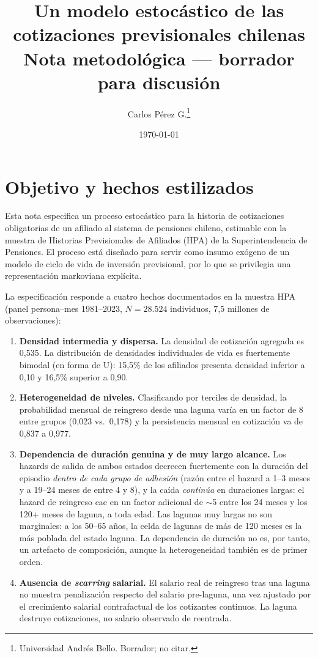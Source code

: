 \documentclass[11pt]{article}
\title{Un modelo estocástico de las cotizaciones previsionales chilenas\\
\large Nota metodológica — borrador para discusión}
\author{Carlos Pérez G.\thanks{Universidad Andrés Bello. Borrador; no citar.}}
\date{\today}
\begin{document}
\maketitle

\section{Objetivo y hechos estilizados}

Esta nota especifica un proceso estocástico para la historia de cotizaciones
obligatorias de un afiliado al sistema de pensiones chileno, estimable con la
muestra de Historias Previsionales de Afiliados (HPA) de la Superintendencia
de Pensiones. El proceso está diseñado para servir como insumo exógeno de un
modelo de ciclo de vida de inversión previsional, por lo que se privilegia una
representación markoviana explícita.

La especificación responde a cuatro hechos documentados en la muestra HPA
(panel persona--mes 1981--2023, $N=28.524$ individuos, 7,5 millones de
observaciones):

\begin{enumerate}
\item \textbf{Densidad intermedia y dispersa.} La densidad de cotización
agregada es 0,535. La distribución de densidades individuales de vida es
fuertemente bimodal (en forma de U): 15,5\% de los afiliados presenta densidad
inferior a 0,10 y 16,5\% superior a 0,90.
\item \textbf{Heterogeneidad de niveles.} Clasificando por terciles de
densidad, la probabilidad mensual de reingreso desde una laguna varía en un
factor de 8 entre grupos (0,023 vs.\ 0,178) y la persistencia mensual en
cotización va de 0,837 a 0,977.
\item \textbf{Dependencia de duración genuina y de muy largo alcance.} Los
hazards de salida de ambos estados decrecen fuertemente con la duración del
episodio \emph{dentro de cada grupo de adhesión} (razón entre el hazard a
1--3 meses y a 19--24 meses de entre 4 y 8), y la caída \emph{continúa} en
duraciones largas: el hazard de reingreso cae en un factor adicional de
$\sim$5 entre los 24 meses y los 120+ meses de laguna, a toda edad. Las
lagunas muy largas no son marginales: a los 50--65 años, la celda de
lagunas de más de 120 meses es la más poblada del estado laguna. La
dependencia de duración no es, por tanto, un artefacto de composición,
aunque la heterogeneidad también es de primer orden.
\item \textbf{Ausencia de \emph{scarring} salarial.} El salario real de
reingreso tras una laguna no muestra penalización respecto del salario
pre-laguna, una vez ajustado por el crecimiento salarial contrafactual de los
cotizantes continuos. La laguna destruye cotizaciones, no salario observado
de reentrada.
\end{enumerate}
\end{document}
